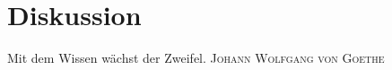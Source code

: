
\chapter{Diskussion} %

\label{Chapter9} %


\begin{itquote}
  Mit dem Wissen wächst der Zweifel.
  \flushright
  \textsc{Johann Wolfgang von Goethe}
\end{itquote}

